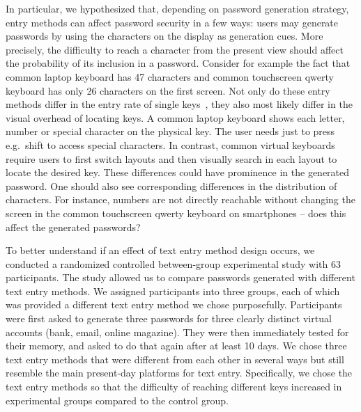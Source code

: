 \documentclass[conference]{IEEEtran}
\begin{document}
In particular, we hypothesized that, depending on password generation strategy, entry methods can affect password security in a few ways: users may generate passwords by using the characters on the display as generation cues. More precisely, the difficulty to reach a character from the present view should affect the probability of its inclusion in a password. Consider for example the fact that common laptop keyboard has 47 characters and common touchscreen qwerty keyboard has only 26 characters on the first screen. Not only do these entry methods differ in the entry rate of single keys~\cite{azenkot2012touch, salthouse1986perceptual}, they also most likely differ in the visual overhead of locating keys. 
A common laptop keyboard shows each letter, number or special character on the physical key. The user needs just to press
e.g.~shift to access special characters.
In contrast, common virtual keyboards require users to first switch layouts and then visually
search in each layout to locate the desired key.
These differences could have prominence in the generated password. One should also see corresponding differences in the distribution of characters. For instance, numbers are not directly reachable without changing the screen in the common touchscreen qwerty keyboard on smartphones -- does this affect the generated passwords? 

To better understand if an effect of text entry method design occurs, we conducted a randomized controlled between-group experimental study with 63 participants. The study allowed us to compare passwords generated with different text entry methods. We assigned participants into three groups, each of which was provided a different text entry method we chose purposefully. Participants were first asked to generate three passwords for three clearly distinct virtual accounts (bank, email, online magazine). They were then immediately tested for their memory, and asked to do that again after at least 10 days. We chose three text entry methods that were different from each other in several ways but still resemble the main present-day platforms for text entry. Specifically, we chose the text entry methods so that the difficulty of reaching different keys increased in experimental groups compared to the control group.
\end{document}
